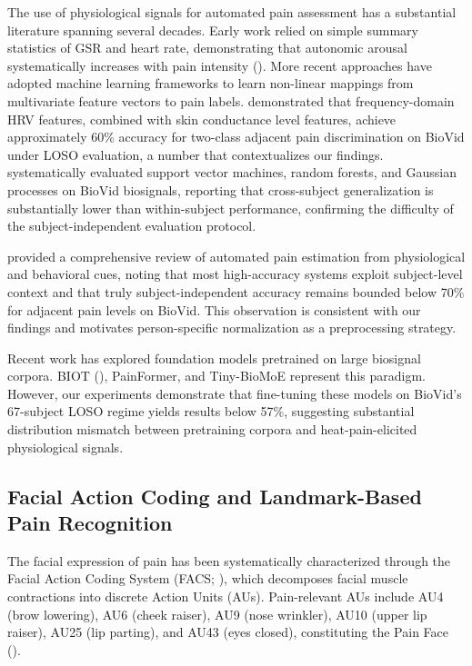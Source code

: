 \documentclass[10pt, twocolumn]{article}
\begin{document}
The use of physiological signals for automated pain assessment has a substantial literature
spanning several decades. Early work relied on simple summary statistics of GSR and heart
rate, demonstrating that autonomic arousal systematically increases with pain intensity
(\cite{Loggia2011}). More recent approaches have adopted machine learning frameworks to
learn non-linear mappings from multivariate feature vectors to pain labels.
\textcite{Tavakolian2020} demonstrated that frequency-domain HRV features, combined with
skin conductance level features, achieve approximately 60\% accuracy for two-class adjacent
pain discrimination on BioVid under LOSO evaluation, a number that contextualizes our
findings. \textcite{Kachele2015} systematically evaluated support vector machines, random
forests, and Gaussian processes on BioVid biosignals, reporting that cross-subject
generalization is substantially lower than within-subject performance, confirming the
difficulty of the subject-independent evaluation protocol.

\textcite{Gkikas2023} provided a comprehensive review of automated pain estimation from
physiological and behavioral cues, noting that most high-accuracy systems exploit
subject-level context and that truly subject-independent accuracy remains bounded below
70\% for adjacent pain levels on BioVid. This observation is consistent with our findings
and motivates person-specific normalization as a preprocessing strategy.

Recent work has explored foundation models pretrained on large biosignal corpora.
BIOT (\cite{Yang2023}), PainFormer, and Tiny-BioMoE represent this paradigm. However,
our experiments demonstrate that fine-tuning these models on BioVid's 67-subject LOSO
regime yields results below 57\%, suggesting substantial distribution mismatch between
pretraining corpora and heat-pain-elicited physiological signals.

\subsection{Facial Action Coding and Landmark-Based Pain Recognition}

The facial expression of pain has been systematically characterized through the Facial
Action Coding System (FACS; \cite{Ekman1978}), which decomposes facial muscle contractions
into discrete Action Units (AUs). Pain-relevant AUs include AU4 (brow lowering), AU6
(cheek raiser), AU9 (nose wrinkler), AU10 (upper lip raiser), AU25 (lip parting), and
AU43 (eyes closed), constituting the Pain Face (\cite{Prkachin2008}).
\end{document}
